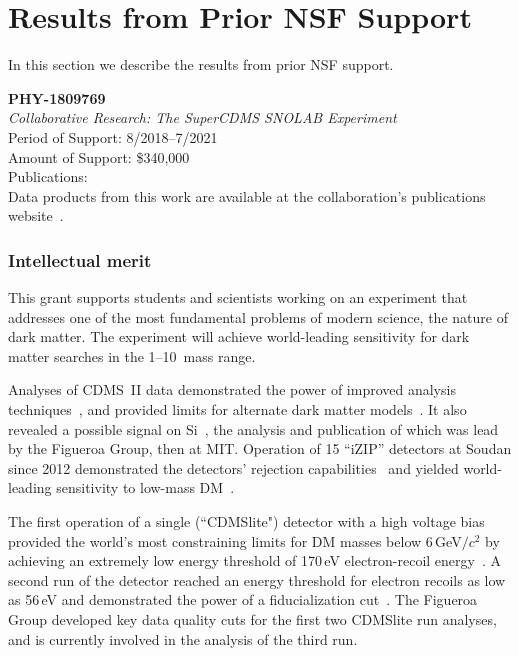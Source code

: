 
\section{Results from Prior NSF Support}
\label{sec:prev-res}

In this section we describe the results from prior NSF support.

\vspace{3pt}
\noindent\textbf{PHY-1809769}\\ 
\emph{Collaborative Research: The SuperCDMS SNOLAB Experiment }\\
Period of Support: 8/2018--7/2021\\
Amount of Support: \$340,000\\
Publications:~\cite{SuperCDMSSensitvitiy:2016arXiv,Agnese:2015nto,OHare2015Readout-strateg,Agnese:2015ywx,Schneck2015Dark-matter-eff,Pyle2015Optimized-Desig,Agnese:2014xye,Agnese:2014vxh,2015PhRvD..91i5023B,Ruppin:2014bra,Agnese:2014aze}\\
Data products from this work are available at the \SuperCDMS collaboration's publications website~\cite{CDMSpubs}.


\subsubsection{Intellectual merit} 
This grant supports students and scientists working on an experiment that addresses one of the most fundamental problems of modern science, the nature of dark matter. The \scs experiment will achieve world-leading sensitivity for dark matter searches in the 1--10~\gev mass range.

Analyses of CDMS~II data demonstrated the power of improved analysis techniques~\cite{Agnese:2014xye,Agnese:2015ywx}, and provided limits for alternate dark matter models~\cite{Agnese:2014vxh}. It also revealed a possible signal on Si~\cite{Agnese:13prl}, the analysis and publication of which was lead by the Figueroa Group, then at MIT. 
Operation of 15 \SuperCDMS ``iZIP'' detectors at Soudan since 2012 demonstrated the detectors' rejection capabilities~\cite{Agnese:13apl} and yielded world-leading sensitivity to low-mass 
DM~\cite{Agnese:13prl2,Agnese:2014aze,Agnese:2015nto}.  

The first operation of a single (``CDMSlite") detector with a high voltage bias provided the world's most constraining limits for DM masses below 6\,GeV$/c^2$ by achieving an extremely low energy threshold of 170\,eV electron-recoil energy~\cite{Agnese:13prl2}. A second run of the detector reached an energy threshold for electron recoils as low as 56\,eV and demonstrated the power of a fiducialization cut~\cite{Agnese:2015nto}. The Figueroa Group developed key data quality cuts for the first two CDMSlite run analyses, and is currently involved in the analysis of the third run.
 
